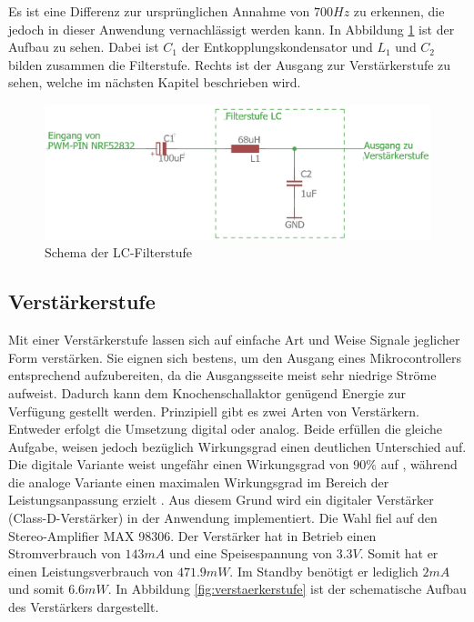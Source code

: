 Es ist eine Differenz zur ursprünglichen Annahme von $700 Hz$ zu erkennen, die jedoch in dieser Anwendung vernachlässigt werden kann. In Abbildung \ref{fig:Filterstufe} ist der Aufbau zu sehen. Dabei ist $C_{1}$ der Entkopplungskondensator und $L_{1}$ und $C_{2}$ bilden zusammen die Filterstufe. Rechts ist der Ausgang zur Verstärkerstufe zu sehen, welche im nächsten Kapitel beschrieben wird.


\begin{figure}[H]
	\begin{center}
		\includegraphics[width=120mm]{data/Schema_Filterstufe.png}
		\caption[Schema der LC-Filterstufe]{Schema der LC-Filterstufe}
		\label{fig:Filterstufe}
	\end{center}
\end{figure}

\subsection{Verstärkerstufe} \label{sec:verstaerkerstufe}
Mit einer Verstärkerstufe lassen sich auf einfache Art und Weise Signale jeglicher Form verstärken. Sie eignen sich bestens, um den Ausgang eines Mikrocontrollers entsprechend aufzubereiten, da die Ausgangsseite meist sehr niedrige Ströme aufweist. Dadurch kann dem Knochenschallaktor genügend Energie zur Verfügung gestellt werden. Prinzipiell gibt es zwei Arten von Verstärkern. Entweder erfolgt die Umsetzung digital oder analog. Beide erfüllen die gleiche Aufgabe, weisen jedoch bezüglich Wirkungsgrad einen deutlichen Unterschied auf. Die digitale Variante weist ungefähr einen Wirkungsgrad von 90$\%$ auf \cite{BoneConductorAdafruit}, während die analoge Variante einen maximalen Wirkungsgrad im Bereich der Leistungsanpassung erzielt \cite{Niklaus_Skript}. Aus diesem Grund wird ein digitaler Verstärker (Class-D-Verstärker) in der Anwendung implementiert. Die Wahl fiel auf den Stereo-Amplifier MAX 98306. Der Verstärker hat in Betrieb einen Stromverbrauch von $143mA$ und eine Speisespannung von $3.3V$. Somit hat er einen Leistungsverbrauch von $471.9 mW$. Im Standby benötigt er lediglich $2 mA$ und somit $6.6 mW$\cite{Verstaerker}. In Abbildung \ref{fig:verstaerkerstufe} ist der schematische Aufbau des Verstärkers dargestellt.

